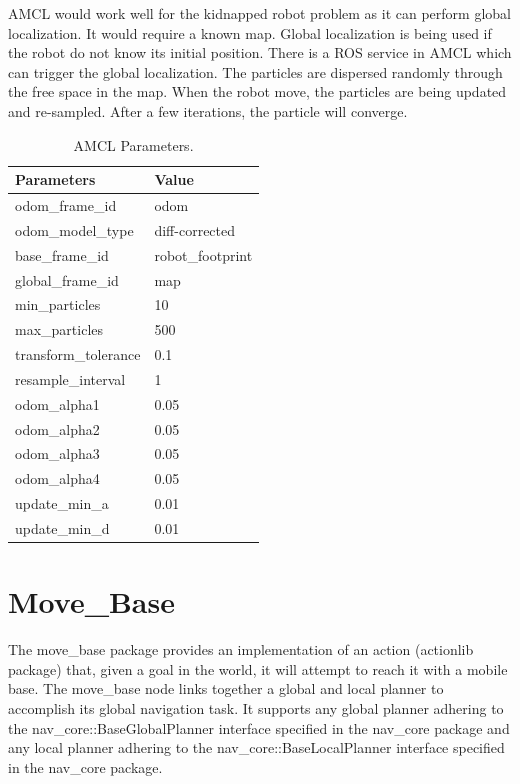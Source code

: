 \documentclass[10pt,journal,compsoc]{IEEEtran}
\begin{document}
AMCL would work well for the kidnapped robot problem as it can perform global localization.  It would require a known map. Global localization is being used if the robot do not know its initial position. There is a ROS service in AMCL which can trigger the global localization. The particles are dispersed randomly through the free space in the map. When the robot move, the particles are being updated and re-sampled. After a few iterations, the particle will converge.

\begin{table}[thpb]
\begin{tabular}{|l|l|}
\hline
\textbf{Parameters}  & \textbf{Value}   \\ \hline
odom\_frame\_id      & odom             \\ \hline
odom\_model\_type    & diff-corrected   \\ \hline
base\_frame\_id      & robot\_footprint \\ \hline
global\_frame\_id    & map              \\ \hline
min\_particles       & 10               \\ \hline
max\_particles       & 500              \\ \hline
transform\_tolerance & 0.1              \\ \hline
resample\_interval   & 1                \\ \hline
odom\_alpha1         & 0.05             \\ \hline
odom\_alpha2         & 0.05             \\ \hline
odom\_alpha3         & 0.05             \\ \hline
odom\_alpha4         & 0.05             \\ \hline
update\_min\_a       & 0.01             \\ \hline
update\_min\_d       & 0.01             \\ \hline
\end{tabular}
\caption{AMCL Parameters.}
\label{tab:template2}
\end{table}

\section{Move\_Base}
The move\_base package provides an implementation of an action (actionlib package) that, given a goal in the world, it will attempt to reach it with a mobile base. The move\_base node links together a global and local planner to accomplish its global navigation task. It supports any global planner adhering to the nav\_core::BaseGlobalPlanner interface specified in the nav\_core package and any local planner adhering to the nav\_core::BaseLocalPlanner interface specified in the nav\_core package.
\end{document}
